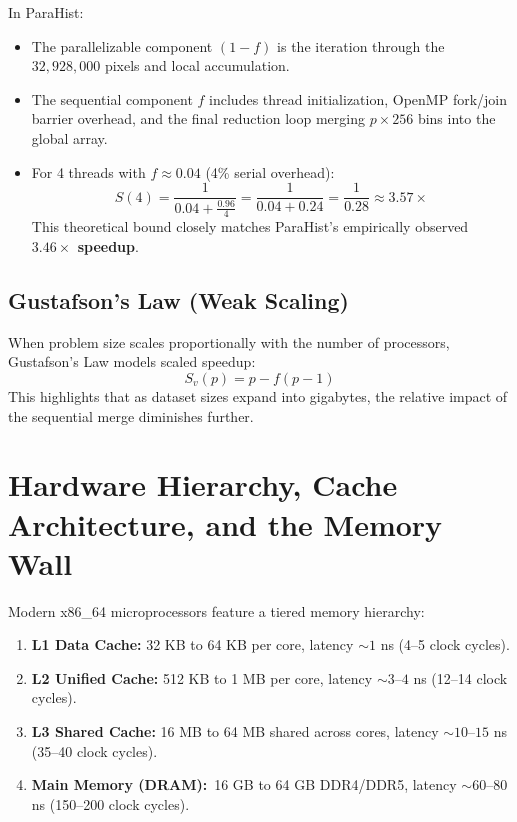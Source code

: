 \documentclass[12pt,a4paper,oneside]{report}
\begin{document}
In ParaHist:
\begin{itemize}
    \item The parallelizable component $(1 - f)$ is the iteration through the $32,928,000$ pixels and local accumulation.
    \item The sequential component $f$ includes thread initialization, OpenMP fork/join barrier overhead, and the final reduction loop merging $p \times 256$ bins into the global array.
    \item For 4 threads with $f \approx 0.04$ (4\% serial overhead):
    \begin{equation}
        S(4) = \frac{1}{0.04 + \frac{0.96}{4}} = \frac{1}{0.04 + 0.24} = \frac{1}{0.28} \approx 3.57\times
    \end{equation}
    This theoretical bound closely matches ParaHist's empirically observed \textbf{$3.46\times$ speedup}.
\end{itemize}

\subsection{Gustafson's Law (Weak Scaling)}
When problem size scales proportionally with the number of processors, Gustafson's Law models scaled speedup:
\begin{equation}
    S_v(p) = p - f(p - 1)
\end{equation}
This highlights that as dataset sizes expand into gigabytes, the relative impact of the sequential merge diminishes further.

\section{Hardware Hierarchy, Cache Architecture, and the Memory Wall}
Modern x86\_64 microprocessors feature a tiered memory hierarchy:
\begin{enumerate}
    \item \textbf{L1 Data Cache:} 32 KB to 64 KB per core, latency $\sim 1$ ns (4--5 clock cycles).
    \item \textbf{L2 Unified Cache:} 512 KB to 1 MB per core, latency $\sim 3$--$4$ ns (12--14 clock cycles).
    \item \textbf{L3 Shared Cache:} 16 MB to 64 MB shared across cores, latency $\sim 10$--$15$ ns (35--40 clock cycles).
    \item \textbf{Main Memory (DRAM):}\ 16 GB to 64 GB DDR4/DDR5, latency $\sim 60$--$80$ ns (150--200 clock cycles).
\end{enumerate}
\end{document}
